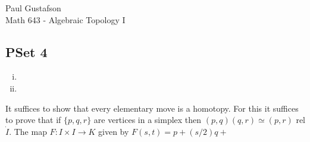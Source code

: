 \documentclass{article}
\begin{document}
\noindent Paul Gustafson\\
\noindent Math 643 - Algebraic Topology I


\subsection*{PSet 4}
 \begin{enumerate}[(i)]
\item 
\item
\end{enumerate} 
 It suffices to show that every elementary move is a homotopy.  For this it suffices to prove that if $\{p,q,r\}$ are vertices in a simplex then $(p,q)(q,r) \simeq (p,r)$ rel $\dot I$. The map $F:I \times I \to K$ given by
$F(s,t) = p + (s/2)q + $
\end{document}
